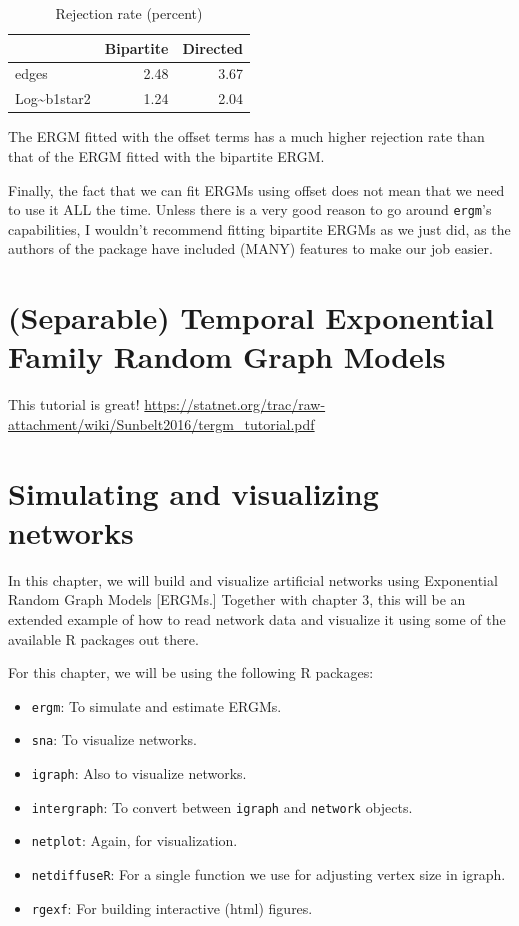 \documentclass[]{book}
\providecommand{\tightlist}{%
  \setlength{\itemsep}{0pt}\setlength{\parskip}{0pt}}
\begin{document}
\begin{table}

\caption{\label{tab:05-example2-post-dist}Rejection rate (percent)}
\centering
\begin{tabular}[t]{l|r|r}
\hline
  & Bipartite & Directed\\
\hline
edges & 2.48 & 3.67\\
\hline
Log\textasciitilde{}b1star2 & 1.24 & 2.04\\
\hline
\end{tabular}
\end{table}

The ERGM fitted with the offset terms has a much higher rejection rate
than that of the ERGM fitted with the bipartite ERGM.

Finally, the fact that we can fit ERGMs using offset does not mean that
we need to use it ALL the time. Unless there is a very good reason to
go around \texttt{ergm}'s capabilities, I wouldn't recommend fitting bipartite
ERGMs as we just did, as the authors of the package have included (MANY)
features to make our job easier.

\hypertarget{separable-temporal-exponential-family-random-graph-models}{%
\chapter{(Separable) Temporal Exponential Family Random Graph Models}\label{separable-temporal-exponential-family-random-graph-models}}

This tutorial is great! \url{https://statnet.org/trac/raw-attachment/wiki/Sunbelt2016/tergm_tutorial.pdf}

\hypertarget{simulating-and-visualizing-networks}{%
\chapter{Simulating and visualizing networks}\label{simulating-and-visualizing-networks}}

In this chapter, we will build and visualize artificial networks using Exponential
Random Graph Models {[}ERGMs.{]} Together with chapter 3, this will be an extended
example of how to read network data and visualize it using some of the available
R packages out there.

For this chapter, we will be using the following R packages:

\begin{itemize}
\tightlist
\item
  \texttt{ergm}: To simulate and estimate ERGMs.
\item
  \texttt{sna}: To visualize networks.
\item
  \texttt{igraph}: Also to visualize networks.
\item
  \texttt{intergraph}: To convert between \texttt{igraph} and \texttt{network} objects.
\item
  \texttt{netplot}: Again, for visualization.
\item
  \texttt{netdiffuseR}: For a single function we use for adjusting vertex size in igraph.
\item
  \texttt{rgexf}: For building interactive (html) figures.
\end{itemize}
\end{document}
